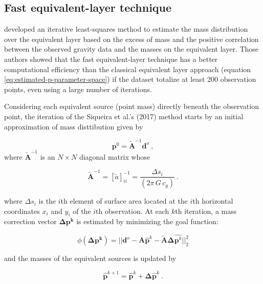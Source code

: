 \documentclass[manuscript,revised]{geophysics}
\begin{document}
\subsection{Fast equivalent-layer technique}
\citet{siqueira-etal2017} developed an iterative least-squares method to estimate the mass distribution over the equivalent layer based on the excess of mass and the positive correlation between the observed gravity data and the masses on the equivalent layer. Those authors showed that the fast equivalent-layer technique has a better computational efficiency than the classical equivalent layer approach (equation \ref{eq:estimated-p-parameter-space}) if the dataset totalize at least 200 observation points, even using a large number of iterations.

Considering each equivalent source (point mass) directly beneath the observation point, the iteration of the Siqueira et al.'s (2017) method starts by an initial approximation of mass disttibution given by

\begin{equation}
\mathbf{p}^0 = \tilde{\mathbf{A}}^{-1} \mathbf{d}^{o} \: ,
\label{eq:initial_m}
\end{equation}
where $\tilde{\mathbf{A}}^{-1}$ is an $N \times N$ diagonal matrix whose

\begin{equation}
\tilde{\mathbf{A}}^{-1} = [\tilde{a}]_{ii}^{-1} = \frac{\Delta s_i}{(2 \pi \, G \, c_g)} \: .
\label{eq:a_approx}
\end{equation}

where $\Delta s_i$ is the $i$th element of surface area located at the $i$th horizontal coordinates $x_i$ and $y_i$ of the $i$th observation.
At each $k$th iteration, a mass correction vector $\mathbf{\Delta p^k}$ is estimated by minimizing the goal function:

\begin{equation}
\phi(\mathbf{\Delta p^k}) = ||\mathbf{d}^{o} - \mathbf{A}\hat{\mathbf{p}}^k - \tilde{\mathbf{A}} \mathbf{\Delta} \hat{\mathbf{p}^k}||_2^2
\label{eq:goal-function_fast}
\end{equation}

\noindent and the masses of the equivalent sources is updated by

\begin{equation}
\hat{\mathbf{p}}^{k+1} = \hat{\mathbf{p}}^{k} + \mathbf{\Delta} \hat{\mathbf{p}}^{k} \: .
\label{eq:update_m}
\end{equation}
\end{document}
